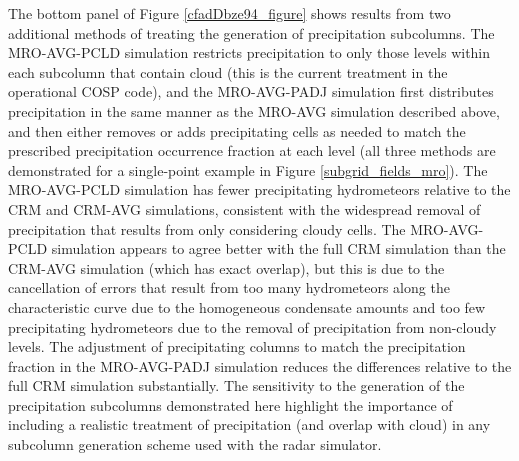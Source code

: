 \documentclass[letter]{article}
\begin{document}
The bottom panel of Figure \ref{cfadDbze94_figure} shows results from two additional methods of treating the generation of precipitation subcolumns. The MRO-AVG-PCLD simulation restricts precipitation to only those levels within each subcolumn that contain cloud (this is the current treatment in the operational COSP code), and the MRO-AVG-PADJ simulation first distributes precipitation in the same manner as the MRO-AVG simulation described above, and then either removes or adds precipitating cells as needed to match the prescribed precipitation occurrence fraction at each level (all three methods are demonstrated for a single-point example in Figure \ref{subgrid_fields_mro}). The MRO-AVG-PCLD simulation has fewer precipitating hydrometeors relative to the CRM and CRM-AVG simulations, consistent with the widespread removal of precipitation that results from only considering cloudy cells. The MRO-AVG-PCLD simulation appears to agree better with the full CRM simulation than the CRM-AVG simulation (which has exact overlap), but this is due to the cancellation of errors that result from too many hydrometeors along the characteristic curve due to the homogeneous condensate amounts and too few precipitating hydrometeors due to the removal of precipitation from non-cloudy levels. The adjustment of precipitating columns to match the precipitation fraction in the MRO-AVG-PADJ simulation reduces the differences relative to the full CRM simulation substantially. The sensitivity to the generation of the precipitation subcolumns demonstrated here highlight the importance of including a realistic treatment of precipitation (and overlap with cloud) in any subcolumn generation scheme used with the radar simulator.
\end{document}
